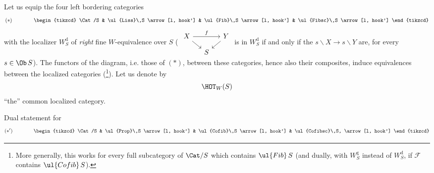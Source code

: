  Let us equip the four left bordering categories
\[
(*)\qquad\qquad
\begin{tikzcd}
\Cat/S & \ul{Liss}\,S \arrow[l, hook'] & \ul{Fib}\,S \arrow[l, hook'] & \ul{Fibsc}\,S \arrow[l, hook']
\end{tikzcd}
\]
with the localizer $W_S^{\mathrm{d}}$ of \textit{right} fine $W$-equivalence over $S$ ( $\begin{tikzcd}[row sep=small, column sep=small]
X \arrow[rr, "f"] \arrow[dr] & & Y \arrow[dl]\\
 & S &
\end{tikzcd}$ is in $W_S^{\mathrm{d}}$ if and only if the $s\backslash X\longrightarrow s\backslash Y$ are, for every $s\in\Ob\,S$). The functors of the diagram, i.e. those of $(*)$, between these categories, hence also their composites, induce equivalences between the localized categories (\footnote[45]{More generally, this works for every full subcategory of $\Cat/S$ which contains $\ul{Fib}\,S$ (and dually, with $W_S^{\mathrm{g}}$ instead of $W_S^{\mathrm{d}}$, if $\mathcal{F}$ contains $\ul{Cofib}\,S$).}). Let us denote by
\[
\HOT_W(S)
\]
``the'' common localized category.

Dual statement for
\[
(*')\qquad\qquad
\begin{tikzcd}
\Cat/S & \ul{Prop}\,S \arrow[l, hook'] & \ul{Cofib}\,S \arrow[l, hook'] & \ul{Cofibsc}\,S, \arrow[l, hook']
\end{tikzcd}
\]


